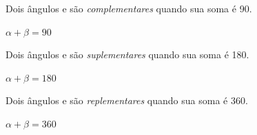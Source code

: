 \begin{caixa}
\begin{tdefinicao}
Dois ângulos  e  são \textit{complementares} quando sua soma é 90\degree .

\textit{ $\alpha + \beta  = 90$\degree }
\end{tdefinicao}

\begin{tdefinicao}
Dois ângulos  e  são \textit{suplementares} quando sua soma é 180\degree .

\textit{ $\alpha + \beta  = 180$\degree}
\end{tdefinicao}

\begin{tdefinicao}
Dois ângulos  e  são \textit{replementares} quando sua soma é 360\degree .

\textit{ $\alpha + \beta  = 360$\degree  }
\end{tdefinicao}

\end{caixa}

